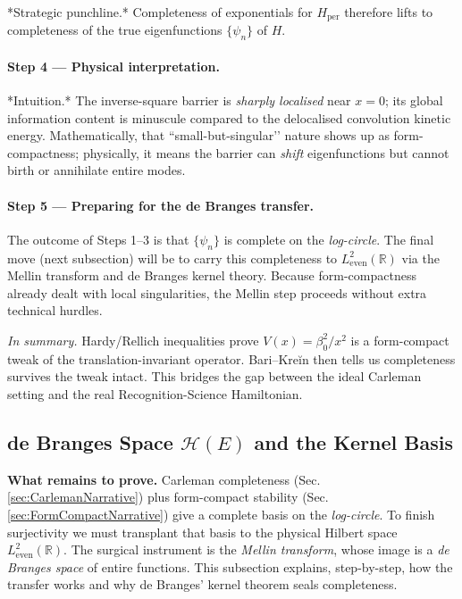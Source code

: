 \documentclass[11pt]{article}
\begin{document}
*Strategic punchline.*  
Completeness of exponentials for \(H_{\mathrm{per}}\) therefore lifts
to completeness of the true eigenfunctions \(\{\psi_n\}\) of \(H\).

\vspace{0.4em}
\paragraph{Step 4 — Physical interpretation.}

*Intuition.*  
The inverse-square barrier is \emph{sharply localised} near \(x=0\);  
its global information content is minuscule compared to the delocalised
convolution kinetic energy.  
Mathematically, that “small-but-singular’’ nature shows up as
form-compactness; physically, it means the barrier can \emph{shift}
eigenfunctions but cannot birth or annihilate entire modes.

\vspace{0.4em}
\paragraph{Step 5 — Preparing for the de Branges transfer.}

The outcome of Steps 1–3 is that \(\{\psi_n\}\) is complete on the
\emph{log-circle}.  
The final move (next subsection) will be to carry this completeness to
\(L^{2}_{\mathrm{even}}(\mathbb R)\) via the Mellin transform and
de Branges kernel theory.  
Because form-compactness already dealt with local singularities, the
Mellin step proceeds without extra technical hurdles.

\bigskip
\noindent
\emph{In summary.}\;
Hardy/Rellich inequalities prove \(V(x)=\beta_0^{2}/x^{2}\) is a
form-compact tweak of the translation-invariant operator.
Bari–Kreĭn then tells us completeness survives the tweak intact.
This bridges the gap between the ideal Carleman setting and the real
Recognition-Science Hamiltonian.

\subsection{de Branges Space \texorpdfstring{$\mathcal H(E)$}{H(E)} and the Kernel Basis}
\label{sec:deBrangesNarrative}

\noindent
\textbf{What remains to prove.}\;
Carleman completeness (Sec.\,\ref{sec:CarlemanNarrative}) plus
form-compact stability (Sec.\,\ref{sec:FormCompactNarrative})
give a complete basis on the \emph{log-circle}.  
To finish surjectivity we must transplant that basis to the physical
Hilbert space  
\(L^{2}_{\mathrm{even}}(\mathbb R)\).  
The surgical instrument is the \emph{Mellin transform}, whose image is
a \textit{de Branges space} of entire functions.  
This subsection explains, step-by-step, how the transfer works and why
de Branges’ kernel theorem seals completeness.
\end{document}

